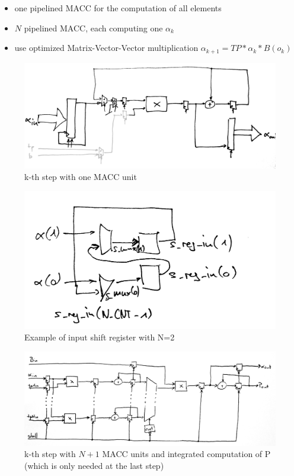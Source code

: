 \documentclass[mscthesis]{usiinfthesis}
\begin{document}
\begin{itemize}
    \item one pipelined MACC for the computation of all elements
    \item $ N $ pipelined MACC, each computing one $ \alpha_k $
    \item use optimized Matrix-Vector-Vector multiplication
        $ \alpha_{k+1} = TP * \alpha_k * B(o_k) $
        \cite{FCCM12_Kestur, ITNG07_Yang}
\end{itemize}

\begin{figure}[h]
    \includegraphics[width=1\columnwidth]{arch_step_s.png}
    \caption{k-th step with one MACC unit}
    \label{fig:step_s}
\end{figure}
\begin{figure}[h]
    \includegraphics[width=1\columnwidth]{./arch_shift_reg_s.png}
    \caption{Example of input shift register with N=2}
    \label{fig:shift_reg_s}
\end{figure}

\begin{figure}[h]
    \includegraphics[width=1\columnwidth]{arch_step_p.png}
    \caption{k-th step with $ N+1 $ MACC units and integrated computation of P
        (which is only needed at the last step)}
    \label{fig:step_p}
\end{figure}
\end{document}
